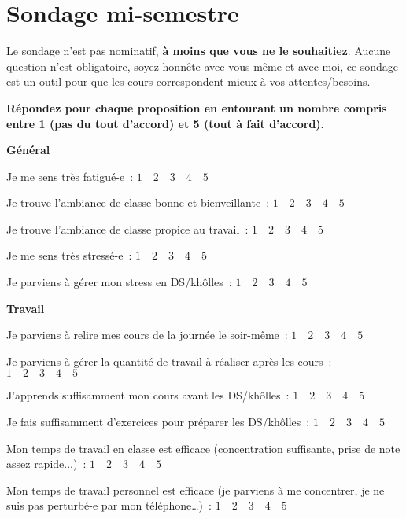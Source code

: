 \documentclass[a4paper, 10pt, final, garamond]{book}
\begin{document}
\setcounter{chapter}{0}

\chapter{Sondage mi-semestre}
\noindent
Le sondage n'est pas nominatif, \textbf{à moins que vous ne le souhaitiez}.
Aucune question n'est obligatoire, soyez honnête avec vous-même et avec moi, ce
sondage est un outil pour que les cours correspondent mieux à vos
attentes/besoins. 

\medskip

\noindent
\textbf{Répondez pour chaque proposition en entourant un nombre compris entre 1
(pas du tout d'accord) et 5 (tout à fait d'accord)}. 

\medskip
\noindent
\textbf{Général}

\medskip
\noindent
{}  Je me sens très fatigué-e~: $1 \quad 2 \quad 3 \quad 4 \quad 5$

\medskip
\noindent
{}  Je trouve l'ambiance de classe bonne et bienveillante~: $1 \quad 2 \quad 3 \quad 4 \quad 5$

\medskip
\noindent
{}  Je trouve l'ambiance de classe propice au travail~: $1 \quad 2 \quad 3 \quad 4 \quad 5$

\medskip
\noindent
{}  Je me sens très stressé-e~: $1 \quad 2 \quad 3 \quad 4 \quad 5$

\medskip
\noindent
{}  Je parviens à gérer mon stress en DS/khôlles~: $1 \quad 2 \quad 3 \quad 4 \quad 5$

\medskip
\noindent
\textbf{Travail}

\medskip
\noindent
{}  Je parviens à relire mes cours de la journée le soir-même~: $1 \quad 2 \quad 3 \quad 4 \quad 5$

\medskip
\noindent
{}  Je parviens à gérer la quantité de travail à réaliser après les cours~: $1 \quad 2 \quad 3 \quad 4 \quad 5$

\medskip
\noindent
{}  J'apprends suffisamment mon cours avant les DS/khôlles~: $1 \quad 2 \quad 3 \quad 4 \quad 5$

\medskip
\noindent
{}  Je fais suffisamment d'exercices pour préparer les DS/khôlles~: $1 \quad 2 \quad 3 \quad 4 \quad 5$

\medskip
\noindent
{}  Mon temps de travail en classe est efficace (concentration suffisante, prise de note assez rapide...)~: $1 \quad 2 \quad 3 \quad 4 \quad 5$

\medskip
\noindent
{}  Mon temps de travail personnel est efficace (je parviens à me
concentrer, je ne suis pas perturbé-e par mon téléphone…)~: $1 \quad 2 \quad 3 \quad 4 \quad 5$
\end{document}
